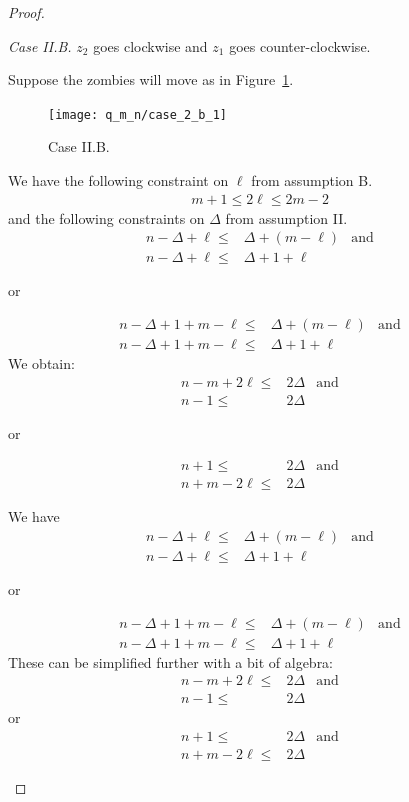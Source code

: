 \begin{proof}
\begin{proofpart}
  \textit{Case II.B.} $z_2$ goes clockwise and $z_1$ goes counter-clockwise.

  Suppose the zombies will move as in Figure~\ref{fig:case_2_b_1}.
  \begin{figure}
    \centering
    \texttt{[image: q\_m\_n/case\_2\_b\_1]}
    \caption{Case II.B. \label{fig:case_2_b_1}}
  \end{figure}

  We have the following constraint on $\ell$ from assumption B.
  \begin{align*}
   m + 1 \leq 2 \ell \leq 2m - 2
  \end{align*}
  and the following constraints on $\Delta$ from assumption II.
  \begin{align*}
   n - \Delta + \ell \leq & \Delta + (m - \ell) & \text{and} \\
   n - \Delta + \ell \leq & \Delta + 1 + \ell
  \end{align*}
  \begin{center}or\end{center}
  \begin{align*}
   n - \Delta + 1 + m - \ell \leq & \Delta + (m - \ell) & \text{and} \\
   n - \Delta + 1 + m - \ell \leq & \Delta + 1 + \ell
  \end{align*}
  We obtain:
  \begin{align*}
   n-m+2\ell \leq & 2 \Delta & \text{and} \\
   n-1 \leq       & 2\Delta
  \end{align*}
  \begin{center}or\end{center}
  \begin{align*}
   n+1 \leq        & 2 \Delta & \text{and} \\
   n+m-2\ell  \leq & 2 \Delta
  \end{align*}

  We have
  \begin{align*}
   n - \Delta + \ell \leq & \Delta + (m - \ell) & \text{and} \\
   n - \Delta + \ell \leq & \Delta + 1 + \ell
  \end{align*}
  \begin{center}or\end{center}
  \begin{align*}
   n - \Delta + 1 + m - \ell \leq & \Delta + (m - \ell) & \text{and} \\
   n - \Delta + 1 + m - \ell \leq & \Delta + 1 + \ell
  \end{align*}
  These can be simplified further with a bit of algebra:
  \begin{align*}
   n-m+2\ell \leq & 2 \Delta & \text{and} \\
   n-1 \leq       & 2\Delta
  \end{align*}
  or
  \begin{align*}
   n+1 \leq        & 2 \Delta & \text{and} \\
   n+m-2\ell  \leq & 2 \Delta
  \end{align*}


\end{proofpart}
\end{proof}
